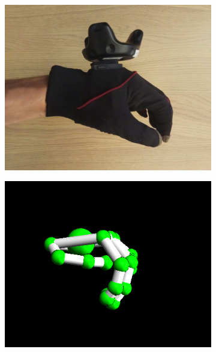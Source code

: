 \documentclass[hyperref, bachelorofscience]{cgvpub}
\begin{document}
\begin{figure}
\begin{subfigure}{.235\linewidth}
		\includegraphics[width=\linewidth]{../pics/hand_radial_nat}
	\end{subfigure}
	\hspace{.01cm}
	\begin{subfigure}{.235\linewidth}
		\includegraphics[width=\linewidth]{../pics/model_radial_nat}
	\end{subfigure}
	\hfill
	\begin{subfigure}{.235\linewidth}

\end{subfigure}
\end{figure}
\end{document}
